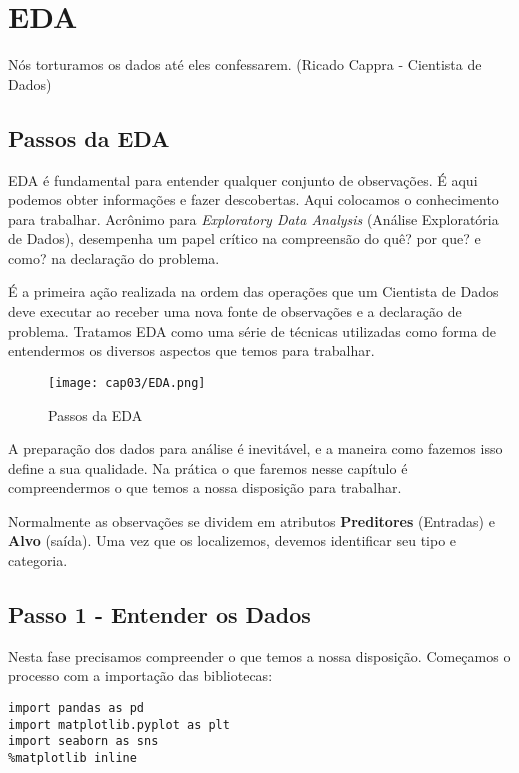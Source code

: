 \chapter{EDA}

\begin{remark}
Nós torturamos os dados até eles confessarem. (Ricado Cappra - Cientista de Dados) 
\end{remark}

\section{Passos da EDA}
EDA é fundamental para entender qualquer conjunto de observações. É aqui podemos obter informações e fazer descobertas. Aqui colocamos o conhecimento para trabalhar. Acrônimo para \textit{Exploratory Data Analysis} (Análise Exploratória de Dados), desempenha um papel crítico na compreensão do quê? por que? e como? na declaração do problema. 

É a primeira ação realizada na ordem das operações que um Cientista de Dados deve executar ao receber uma nova fonte de observações e a declaração de problema. Tratamos EDA como uma série de técnicas utilizadas como forma de entendermos os diversos aspectos que temos para trabalhar.
\begin{figure}[H]
	\centering
	\texttt{[image: cap03/EDA.png]}
	\caption{Passos da EDA}
\end{figure}

A preparação dos dados para análise é inevitável, e a maneira como fazemos isso define a sua qualidade. Na prática o que faremos nesse capítulo é compreendermos o que temos a nossa disposição para trabalhar.

Normalmente as observações se dividem em atributos \textbf{Preditores} (Entradas) e \textbf{Alvo} (saída). Uma vez que os localizemos, devemos identificar seu tipo e categoria.

\section{Passo 1 - Entender os Dados}
Nesta fase precisamos compreender o que temos a nossa disposição. Começamos o processo com a importação das bibliotecas:
\begin{lstlisting}[]
import pandas as pd
import matplotlib.pyplot as plt
import seaborn as sns
%matplotlib inline
\end{lstlisting}

